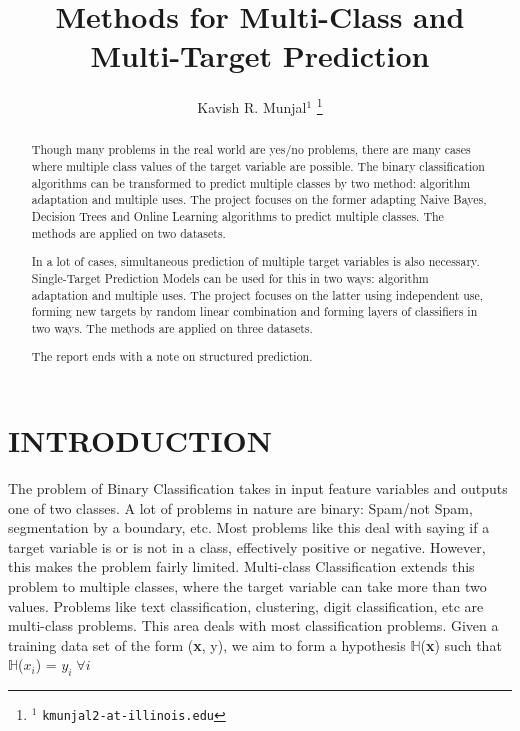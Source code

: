\documentclass[letterpaper, 11 pt, conference]{IEEEtran}  %
\title{\LARGE \bf
Methods for Multi-Class and Multi-Target Prediction
}
\author{Kavish R. Munjal$^{1}$%
\thanks{$^{1}$ {\tt\small kmunjal2-at-illinois.edu}}%
}
\begin{document}
\maketitle
\thispagestyle{empty}
\pagestyle{empty}

\begin{abstract}

Though many problems in the real world are yes/no problems, there are many cases where multiple class values of the target variable are possible. The binary classification algorithms can be transformed to predict multiple classes by two method: algorithm adaptation and multiple uses. The project focuses on the former adapting Naive Bayes, Decision Trees and Online Learning algorithms to predict multiple classes. The methods are applied on two datasets.

In a lot of cases, simultaneous prediction of multiple target variables is also necessary. Single-Target Prediction Models can be used for this in two ways: algorithm adaptation and multiple uses. The project focuses on the latter using independent use, forming new targets by random linear combination and forming layers of classifiers in two ways. The methods are applied on three datasets.

The report ends with a note on structured prediction.
\end{abstract}


\section{INTRODUCTION}

The problem of Binary Classification takes in input feature variables and outputs one of two classes. A lot of problems in nature are binary: Spam/not Spam, segmentation by a boundary, etc. Most problems like this deal with saying if a target variable is or is not in a class, effectively positive or negative. However, this makes the problem fairly limited. Multi-class Classification extends this problem to multiple classes, where the target variable can take more than two values. Problems like text classification, clustering, digit classification, etc are multi-class problems. This area deals with most classification problems. Given a training data set of the form (\textbf{x}, y), we aim to form a hypothesis $\mathbb{H}$(\textbf{x}) such that $\mathbb{H}$(\textbf{$x_i$}) = $y_i\;\forall i$
\end{document}
